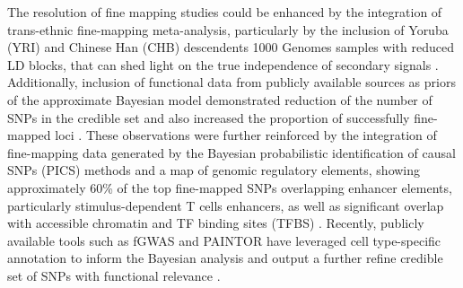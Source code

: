 The resolution of fine mapping studies could be enhanced by the integration of trans-ethnic fine-mapping meta-analysis, particularly by the inclusion of Yoruba (YRI) and Chinese Han (CHB) descendents 1000 Genomes samples with reduced LD blocks, that can shed light on the true independence of secondary signals \parencite{Bunt2015, Kichaev2015}. Additionally, inclusion of functional data from publicly available sources as priors of the approximate Bayesian model demonstrated reduction of the number of SNPs in the credible set and also increased the proportion of successfully fine-mapped loci \parencite{Bunt2015, Kichaev2015}. These observations were further reinforced by the integration of fine-mapping data generated by the Bayesian probabilistic identification of causal SNPs (PICS) methods and a map of genomic regulatory elements, showing approximately 60\% of the top fine-mapped SNPs overlapping enhancer elements, particularly stimulus-dependent T cells enhancers, as well as significant overlap with accessible chromatin and TF binding sites (TFBS) \parencite{Farh2015}. Recently, publicly available tools such as fGWAS and PAINTOR have leveraged cell type-specific annotation to inform the Bayesian analysis and output a further refine credible set of SNPs with functional relevance \parencite{Pickrell2014,Kichaev2015}.





